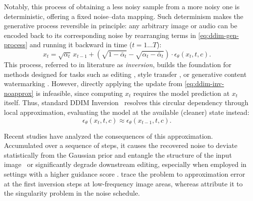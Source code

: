\documentclass{article} %
\begin{document}
Notably, this process of obtaining a less noisy sample from a more noisy one is deterministic, offering a fixed noise--data mapping. Such determinism makes the generative process reversible in principle: any arbitrary image or audio can be encoded back to its corresponding noise by rearranging terms in \cref{eq:ddim-gen-process} and running it backward in time ($t=1\dots T$):
\begin{equation}\label{eq:ddim-inv-noapprox}
    x_t=\sqrt{\alpha_t}\,x_{t-1}+\left(\sqrt{1-\bar{\alpha}_t}-\sqrt{\alpha_t-\bar{\alpha}_t}\right)\cdot\epsilon_\theta(x_t,t,c).
\end{equation}
This process, referred to in literature as \textit{inversion}, builds the foundation for methods designed for tasks such as editing \citep{}, style transfer \citep{}, or generative content watermarking \citep{}. However, directly applying the update from \cref{eq:ddim-inv-noapprox} is infeasible, since computing $x_t$ requires the model prediction at $x_t$ itself. Thus, standard DDIM Inversion~\citep{dhariwal2021diffusion} resolves this circular dependency through local approximation, evaluating the model at the available (cleaner) state instead:
\begin{equation}\label{eq:ddim-inv-approx}
    \epsilon_\theta(x_t,t,c)\approx\epsilon_\theta(x_{t-1},t,c).
\end{equation}

Recent studies have analyzed the consequences of this approximation. Accumulated over a sequence of steps, it causes the recovered noise to deviate statistically from the Gaussian prior and entangle the structure of the input image~\citep{parmar2023zero,garibi2024renoise,lin2024schedule,staniszewski2026there,jiao2026unieditflow} or significantly degrade downstream editing, especially when employed in settings with a higher guidance score \citep{ho2021classifierfree, Mokady_2023_CVPR}. \citet{staniszewski2026there} trace the problem to approximation error at the first inversion steps at low-frequency image areas, whereas \citet{lin2024schedule} attribute it to the singularity problem in the noise schedule. 
\end{document}
